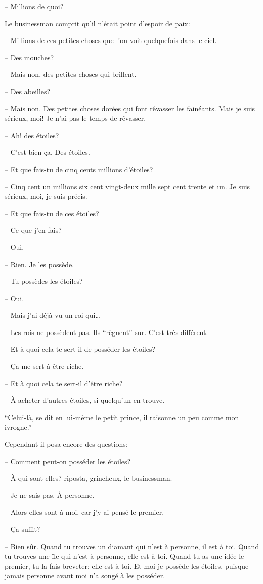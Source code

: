 \begin{Parallel}[p]{}{}
{-- Millions de quoi?

Le businessman comprit qu'il n'était point d'espoir de paix:

-- Millions de ces petites choses que l'on voit quelquefois dans le ciel.

-- Des mouches?

-- Mais non, des petites choses qui brillent.

-- Des abeilles?

-- Mais non. Des petites choses dorées qui font rêvasser les fainéants. Mais je suis sérieux, moi! Je
n'ai pas le temps de rêvasser.

-- Ah! des étoiles?

-- C'est bien ça. Des étoiles.

-- Et que fais-tu de cinq cents millions d'étoiles?

-- Cinq cent un millions six cent vingt-deux mille
sept cent trente et un. Je suis sérieux, moi, je suis
précis.

-- Et que fais-tu de ces étoiles?

-- Ce que j'en fais?

-- Oui.

-- Rien. Je les possède.

-- Tu possèdes les étoiles?

-- Oui.

-- Mais j'ai déjà vu un roi qui\ldots{}

-- Les rois ne possèdent pas. Ils ``règnent'' sur. C'est très différent.

-- Et à quoi cela te sert-il de posséder les étoiles?

-- Ça me sert à être riche.

-- Et à quoi cela te sert-il d'être riche?

-- À acheter d'autres étoiles, si quelqu'un en trouve.

``Celui-là, se dit en lui-même le petit prince, il raisonne un peu comme mon ivrogne.''

Cependant il posa encore des questions:

-- Comment peut-on posséder les étoiles?

-- À qui sont-elles? riposta, grincheux, le businessman.

-- Je ne sais pas. À personne.

-- Alors elles sont à moi, car j'y ai pensé le premier.

-- Ça suffit?

-- Bien sûr. Quand tu trouves un diamant qui
n'est à personne, il est à toi. Quand tu trouves une
île qui n'est à personne, elle est à toi. Quand tu as
une idée le premier, tu la fais breveter: elle est à toi.
Et moi je possède les étoiles, puisque jamais personne avant moi n'a songé à les posséder.

}
\end{Parallel}
